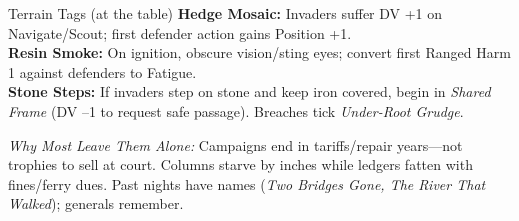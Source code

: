 \documentclass[11pt]{book}
\begin{document}
\begin{atTheTable}{Terrain Tags (at the table)}
\textbf{Hedge Mosaic:} Invaders suffer DV +1 on Navigate/Scout; first defender action gains Position +1. \\
\textbf{Resin Smoke:} On ignition, obscure vision/sting eyes; convert first Ranged Harm 1 against defenders to Fatigue. \\
\textbf{Stone Steps:} If invaders step on stone and keep iron covered, begin in \emph{Shared Frame} (DV --1 to request safe passage). Breaches tick \emph{Under-Root Grudge}.
\end{atTheTable}
\textit{Why Most Leave Them Alone:} Campaigns end in tariffs/repair years---not trophies to sell at court. Columns starve by inches while ledgers fatten with fines/ferry dues. Past nights have names (\emph{Two Bridges Gone, The River That Walked}); generals remember.
\end{document}
